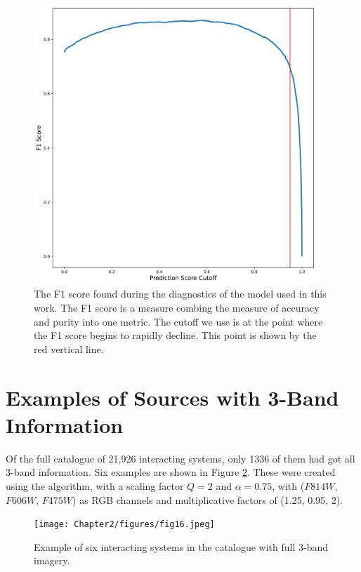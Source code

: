 \begin{figure}
    \centering
    \includegraphics[width = 0.95\textwidth]{Chapter2/figures/fig15.pdf}
    \caption[The F1 score found during the diagnostics of the model used in this work. The F1 score is a measure combing the measure of accuracy and purity into one metric.]{The F1 score found during the diagnostics of the model used in this work. The F1 score is a measure combing the measure of accuracy and purity into one metric. The cutoff we use is at the point where the F1 score begins to rapidly decline. This point is shown by the red vertical line.}
    \label{fig:f1-score}
\end{figure}

\section{Examples of Sources with 3-Band Information}\label{colour-images}
\noindent Of the full catalogue of 21,926 interacting systems, only 1336 of them had got all 3-band information. Six examples are shown in Figure \ref{fig:colour-images}. These were created using the \citet{2004PASP..116..133L} algorithm, with a scaling factor $Q = 2$ and $\alpha = 0.75$, with ($F814W$, $F606W$, $F475W$) as RGB channels and multiplicative factors of (1.25, 0.95, 2).

\begin{figure}
  \centering
  \texttt{[image: Chapter2/figures/fig16.jpeg]}
  \caption[Example of six interacting systems in the catalogue with full 3-band imagery.]{Example of six interacting systems in the catalogue with full 3-band imagery.}
  \label{fig:colour-images}
\end{figure}

